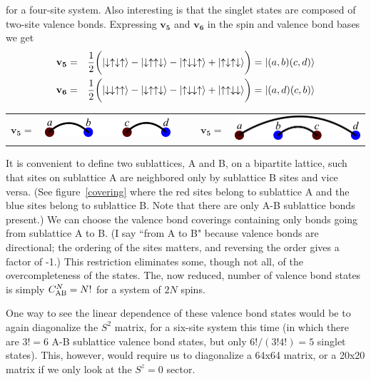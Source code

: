 for a four-site system.
Also interesting is that the singlet states are composed of two-site valence bonds. 
Expressing $\mathbf{v_5}$ and $\mathbf{v_6}$ in the spin and valence bond bases we get
\begin{eqnarray}
\mathbf{v_5} &=&\frac{1}{2}\bigg(\lvert \downarrow \uparrow \downarrow \uparrow \rangle - \lvert \downarrow \uparrow \uparrow \downarrow \rangle
			- \lvert \uparrow \downarrow \downarrow \uparrow \rangle + \lvert \uparrow \downarrow \uparrow \downarrow \rangle \bigg) 
			= \lvert(a,b)(c,d)\rangle\\
\mathbf{v_6} &=&\frac{1}{2}\bigg(\lvert \downarrow \downarrow \uparrow \uparrow \rangle - \lvert \downarrow \uparrow \uparrow \downarrow \rangle
			- \lvert \uparrow \downarrow \downarrow \uparrow \rangle + \lvert \uparrow \uparrow \downarrow \downarrow \rangle \bigg)
			= \lvert(a,d)(c,b)\rangle
\end{eqnarray}
\begin{center}
\begin{tabular}{ccccc}
$\mathbf{v_5} =$ &  \includegraphics [width=2in]{./figures/made/state5.pdf} &\;\;\;\;\;\;\,\,\,\,\,\,
& $\mathbf{v_5} =$ &  \includegraphics [width=2in]{./figures/made/state6.pdf} 
\end{tabular}
\end{center}



It is convenient to define two sublattices, A and B, on a bipartite lattice, such that sites on 
sublattice A are neighbored only by sublattice B sites and vice versa. (See figure~\ref{covering}
where the red sites belong to sublattice A and the blue sites belong to sublattice B.  Note that there are only A-B sublattice bonds present.)
We can choose the valence bond coverings containing only bonds going from sublattice A
to B.  (I say ``from A to B" because valence bonds are directional; the ordering of the
sites matters, and reversing the order gives a factor of -1.)
This restriction eliminates some, though not all, of the overcompleteness of the states.
The, now reduced, number of valence bond states is simply $C_{\rm{AB}}^N = N!$ for a system of $2N$ spins.

One way to see the linear dependence of these valence bond states would be to again diagonalize
the $S^2$ matrix, for a six-site system this time (in which there are $3!=6$ A-B sublattice
valence bond states, but only $6!/(3!4!) = 5$ singlet states).
This, however, would require us to diagonalize a 64x64 matrix, or a 20x20 matrix if we only look at
the $S^z=0$ sector.

